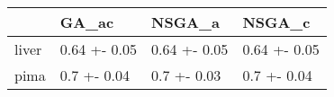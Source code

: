 \begin{tabular}{llll}
\toprule
{} &         GA\_ac &        NSGA\_a &        NSGA\_c \\
\midrule
liver &  0.64 +- 0.05 &  0.64 +- 0.05 &  0.64 +- 0.05 \\
pima  &   0.7 +- 0.04 &   0.7 +- 0.03 &   0.7 +- 0.04 \\
\bottomrule
\end{tabular}
